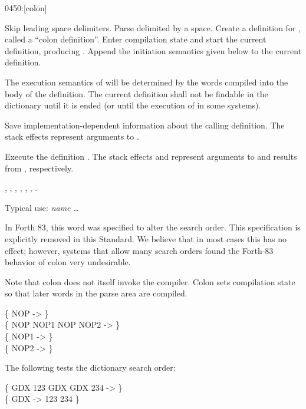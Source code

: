 \begin{worddef}{0450}{:}[colon]
\item {}

	Skip leading space delimiters. Parse  delimited by a
	space. Create a definition for , called a ``colon
	definition''. Enter compilation state and start the current
	definition, producing . Append the initiation
	semantics given below to the current definition.

	The execution semantics of  will be determined by the
	words compiled into the body of the definition. The current
	definition shall not be findable in the dictionary until it is
	ended (or until the execution of  in some systems).

\init {}

	Save implementation-dependent information 
	about the calling definition. The stack effects 
	represent arguments to .

\execute[name]

	Execute the definition . The stack effects
	 and  represent arguments to and
	results from , respectively.

\see {},
	,
	,
	,
	\wref{core:[}{[},
	\wref{core:]}{]},
	.

	\begin{defer}
	\rationale %
		Typical use:
			\word{:} \emph{name} {\ldots} \word{;}

		In Forth 83, this word was specified to alter the search order.
		This specification is explicitly removed in this Standard. We
		believe that in most cases this has no effect; however, systems
		that allow many search orders found the Forth-83 behavior of
		colon very undesirable.

		Note that colon does not itself invoke the compiler. Colon sets
		compilation state so that later words in the parse area are
		compiled.

	\testing
		\{ \word{:} NOP \word{:}  \word{;} \word{;} -> \} \\
		\{ NOP NOP1		NOP NOP2 -> \} \\
		\{ 					NOP1 -> \} \\
		\{ 					NOP2 -> \}

		\textrm{The following tests the dictionary search order:}

		\{ \word{:} GDX   123 \word{;} \tab \word{:} GDX   GDX 234 \word{;} -> \} \\
		\{ GDX -> 123 234 \}
	\end{defer}
\end{worddef}


